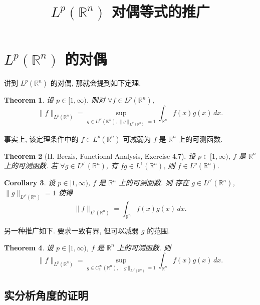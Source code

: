 \documentclass[a4paper,11pt]{article}
\title{$ L^p(\mathbb{R}^n) $ 对偶等式的推广}
\newtheorem{theorem}{Theorem}[section]
\newtheorem{corollary}[theorem]{Corollary}
\theoremstyle{definition}
\begin{document}
\maketitle

\section{$ L^p(\mathbb{R}^n) $ 的对偶}

讲到 $ L^p(\mathbb{R}^n) $ 的对偶, 那就会提到如下定理.

\begin{theorem}
    设 $ p \in [1, \infty) $. 则对 $ \forall f \in L^p(\mathbb{R}^n) $,
    $$
        \| f \|_{L^p(\mathbb{R}^n)} = \sup_{g \in L^{p'}(\mathbb{R}^n), \| g \|_{L^{p'}(\mathbb{R}^n)} \, = 1} 
            \int_{\mathbb{R}^n} f(x) g(x) \, dx.
    $$
\end{theorem}

事实上, 该定理条件中的 $ f \in L^p(\mathbb{R}^n) $ 可减弱为 $ f $ 是 $ \mathbb{R}^n $ 上的可测函数.

\begin{theorem}[H. Brezis, Functional Analysis, Exercise 4.7] 
    设 $ p \in [1, \infty) $, $ f $ 是 $ \mathbb{R}^n $ 上的可测函数.
    若 $ \forall g \in L^{p'}(\mathbb{R}^n) $, 有 $ fg \in L^1(\mathbb{R}^n) $,
    则 $ f \in L^p(\mathbb{R}^n) $.
\end{theorem}

\begin{corollary}
    设 $ p \in [1, \infty) $, $ f $ 是 $ \mathbb{R}^n $ 上的可测函数. 则
    存在 $ g \in L^{p'}(\mathbb{R}^n) $,$ \| g \|_{L^{p'}(\mathbb{R}^n)} = 1 $ 使得
    $$
        \| f \|_{L^p(\mathbb{R}^n)} = \int_{\mathbb{R}^n} f(x) g(x) \, dx.
    $$
\end{corollary}

另一种推广如下. 要求一致有界, 但可以减弱 $ g $ 的范围.

\begin{theorem} \label{text}
    设 $ p \in [1, \infty) $, $ f $ 是 $ \mathbb{R}^n $ 上的可测函数. 则
    \begin{equation} \label{haha}
        \| f \|_{L^p(\mathbb{R}^n)} = \sup_{g \in C_c^\infty(\mathbb{R}^n), \| g \|_{L^{p'}(\mathbb{R}^n)} = 1} 
            \int_{\mathbb{R}^n} f(x) g(x) \, dx.
    \end{equation}
\end{theorem}

\subsection{实分析角度的证明}
\end{document}
